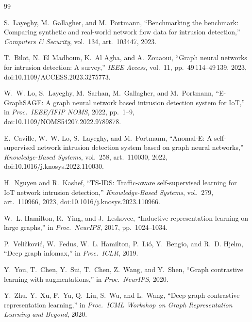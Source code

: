 \documentclass{ieeeaccess}
\begin{document}

\begin{thebibliography}{99}

S.~Layeghy, M.~Gallagher, and M.~Portmann,
``Benchmarking the benchmark: Comparing synthetic and real-world network
flow data for intrusion detection,''
\emph{Computers \& Security}, vol.~134, art.~103447, 2023.

T.~Bilot, N.~El Madhoun, K.~Al Agha, and A.~Zouaoui,
``Graph neural networks for intrusion detection: A survey,''
\emph{IEEE Access}, vol.~11, pp.~49\,114--49\,139, 2023,
doi:10.1109/ACCESS.2023.3275773.

W.~W. Lo, S.~Layeghy, M.~Sarhan, M.~Gallagher, and M.~Portmann,
``E-GraphSAGE: A graph neural network based intrusion detection system for
IoT,'' in \emph{Proc.\ IEEE/IFIP NOMS}, 2022, pp.~1--9,
doi:10.1109/NOMS54207.2022.9789878.

E.~Caville, W.~W. Lo, S.~Layeghy, and M.~Portmann,
``Anomal-E: A self-supervised network intrusion detection system based on
graph neural networks,''
\emph{Knowledge-Based Systems}, vol.~258, art.~110030, 2022,
doi:10.1016/j.knosys.2022.110030.

H.~Nguyen and R.~Kashef,
``TS-IDS: Traffic-aware self-supervised learning for IoT network intrusion
detection,''
\emph{Knowledge-Based Systems}, vol.~279, art.~110966, 2023,
doi:10.1016/j.knosys.2023.110966.

W.~L. Hamilton, R.~Ying, and J.~Leskovec,
``Inductive representation learning on large graphs,''
in \emph{Proc.\ NeurIPS}, 2017, pp.~1024--1034.

P.~Veli\v{c}kovi\'{c}, W.~Fedus, W.~L. Hamilton, P.~Li\'{o}, Y.~Bengio,
and R.~D. Hjelm,
``Deep graph infomax,''
in \emph{Proc.\ ICLR}, 2019.

Y.~You, T.~Chen, Y.~Sui, T.~Chen, Z.~Wang, and Y.~Shen,
``Graph contrastive learning with augmentations,''
in \emph{Proc.\ NeurIPS}, 2020.

Y.~Zhu, Y.~Xu, F.~Yu, Q.~Liu, S.~Wu, and L.~Wang,
``Deep graph contrastive representation learning,''
in \emph{Proc.\ ICML Workshop on Graph Representation Learning and
Beyond}, 2020.


\end{thebibliography}
\end{document}
